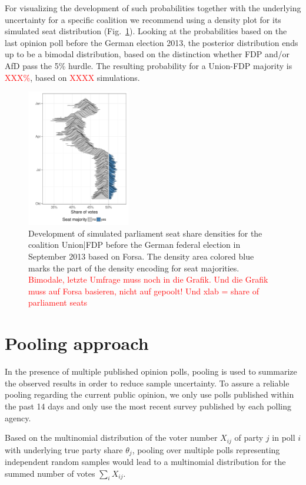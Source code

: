 \documentclass[twoside]{report}
\begin{document}
For visualizing the development of such probabilities together with the underlying uncertainty for a specific coalition we recommend using a density plot for its simulated seat distribution (Fig.~\ref{bauer:dens}). Looking at the probabilities based on the last opinion poll before the German election 2013, the posterior distribution ends up to be a bimodal distribution, based on the distinction whether FDP and/or AfD pass the 5\% hurdle. The resulting probability for a Union-FDP majority is \textcolor{red}{XXX\%}, based on \textcolor{red}{XXXX} simulations.


\begin{figure}[!ht]\centering
\includegraphics[width=0.4\textwidth]{figures/bauer_seatDist_time.pdf}
\caption{\label{bauer:dens} Development of simulated parliament seat share densities for the coalition Union|FDP before the German federal election in September 2013 based on Forsa. The density area colored blue marks the part of the density encoding for seat majorities. \textcolor{red}{Bimodale, letzte Umfrage muss noch in die Grafik. Und die Grafik muss auf Forsa basieren, nicht auf gepoolt! Und xlab = share of parliament seats}
}
\end{figure}




\section{Pooling approach}
In the presence of multiple published opinion polls, pooling is used to summarize the observed results in order to reduce sample uncertainty. To assure a reliable pooling regarding the current public opinion, we only use polls published within the past 14 days and only use the most recent survey published by each polling agency.

Based on the multinomial distribution of the voter number $X_{ij}$ of party $j$ in poll $i$ with underlying true party share $\theta_j$, pooling over multiple polls representing independent random samples would lead to a multinomial distribution for the summed number of votes $\sum_i X_{ij}$.
\end{document}
